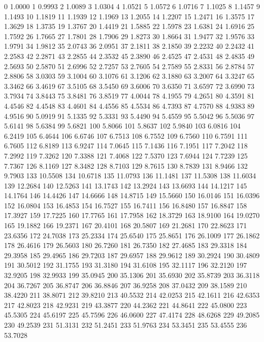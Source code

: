 0 1.0000
1 0.9993
2 1.0089
3 1.0304
4 1.0521
5 1.0572
6 1.0716
7 1.1025
8 1.1457
9 1.1493
10 1.1819
11 1.1939
12 1.1969
13 1.2055
14 1.2207
15 1.2471
16 1.3575
17 1.3629
18 1.3735
19 1.3767
20 1.4419
21 1.5885
22 1.5978
23 1.6381
24 1.6916
25 1.7592
26 1.7665
27 1.7801
28 1.7906
29 1.8273
30 1.8664
31 1.9477
32 1.9576
33 1.9791
34 1.9812
35 2.0743
36 2.0951
37 2.1811
38 2.1850
39 2.2232
40 2.2432
41 2.2583
42 2.2871
43 2.2855
44 2.3532
45 2.3890
46 2.4525
47 2.4531
48 2.4835
49 2.5693
50 2.5870
51 2.6996
52 2.7257
53 2.7605
54 2.7589
55 2.8331
56 2.8784
57 2.8806
58 3.0303
59 3.1004
60 3.1076
61 3.1206
62 3.1880
63 3.2007
64 3.3247
65 3.3462
66 3.4619
67 3.5105
68 3.5450
69 3.6006
70 3.6350
71 3.6597
72 3.6990
73 3.7934
74 3.8443
75 3.8481
76 3.8519
77 4.0044
78 4.1955
79 4.2651
80 4.3591
81 4.4546
82 4.4548
83 4.4601
84 4.4556
85 4.5534
86 4.7393
87 4.7570
88 4.9383
89 4.9516
90 5.0919
91 5.1335
92 5.3331
93 5.4490
94 5.4559
95 5.5042
96 5.5036
97 5.6141
98 5.6384
99 5.6821
100 5.8066
101 5.8637
102 5.9840
103 6.0816
104 6.2419
105 6.4644
106 6.6746
107 6.7513
108 6.7552
109 6.7560
110 6.7591
111 6.7605
112 6.8189
113 6.9247
114 7.0645
115 7.1436
116 7.1951
117 7.2042
118 7.2992
119 7.3262
120 7.3388
121 7.4068
122 7.5370
123 7.6944
124 7.7239
125 7.7367
126 8.1169
127 8.3482
128 8.7103
129 8.7615
130 8.7839
131 8.9466
132 9.7903
133 10.5508
134 10.6718
135 11.0793
136 11.1481
137 11.5308
138 11.6034
139 12.2684
140 12.5263
141 13.1743
142 13.2924
143 13.6693
144 14.1217
145 14.1764
146 14.4426
147 14.6666
148 14.8715
149 15.5660
150 16.0146
151 16.0396
152 16.0804
153 16.4853
154 16.7527
155 16.7411
156 16.8480
157 16.8847
158 17.3927
159 17.7225
160 17.7765
161 17.7958
162 18.3729
163 18.9100
164 19.0270
165 19.1882
166 19.2371
167 20.4101
168 20.5807
169 21.2681
170 22.8623
171 23.6356
172 24.7038
173 25.2334
174 25.6540
175 25.8651
176 26.1009
177 26.1862
178 26.4616
179 26.5603
180 26.7260
181 26.7350
182 27.4685
183 29.3318
184 29.3958
185 29.4965
186 29.7203
187 29.6957
188 29.9612
189 30.2924
190 30.4809
191 30.5012
192 31.1755
193 31.3180
194 31.6108
195 32.1117
196 32.2120
197 32.9205
198 32.9933
199 35.0945
200 35.1306
201 35.6930
202 35.8739
203 36.3118
204 36.7267
205 36.8747
206 36.8846
207 36.9258
208 37.0432
209 38.1589
210 38.4220
211 38.8071
212 39.8210
213 40.5532
214 42.0253
215 42.1611
216 42.6353
217 42.8023
218 42.9231
219 43.3877
220 44.2362
221 44.8641
222 45.0800
223 45.5305
224 45.6197
225 45.7596
226 46.0600
227 47.4174
228 48.6268
229 49.2085
230 49.2539
231 51.3131
232 51.2451
233 51.9763
234 53.3451
235 53.4555
236 53.7028
